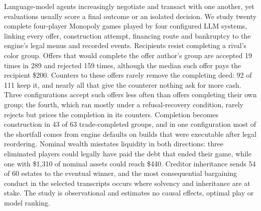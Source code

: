 Language-model agents increasingly negotiate and transact with one another, yet evaluations usually score a final outcome or an isolated decision. We study twenty complete four-player Monopoly games played by four configured LLM systems, linking every offer, construction attempt, financing route and bankruptcy to the engine's legal menus and recorded events. Recipients resist completing a rival's color group. Offers that would complete the offer author's group are accepted 19 times in 289 and rejected 159 times, although the median such offer pays the recipient \$200. Counters to these offers rarely remove the completing deed: 92 of 111 keep it, and nearly all that give the counterer nothing ask for more cash. Three configurations accept such offers less often than offers completing their own group; the fourth, which ran mostly under a refusal-recovery condition, rarely rejects but prices the completion in its counters. Completion becomes construction in 43 of 63 trade-completed groups, and in one configuration most of the shortfall comes from engine defaults on builds that were executable after legal reordering. Nominal wealth misstates liquidity in both directions: three eliminated players could legally have paid the debt that ended their game, while one with \$1,310 of nominal assets could reach \$440. Creditor inheritance sends 54 of 60 estates to the eventual winner, and the most consequential bargaining conduct in the selected transcripts occurs where solvency and inheritance are at stake. The study is observational and estimates no causal effects, optimal play or model ranking.

